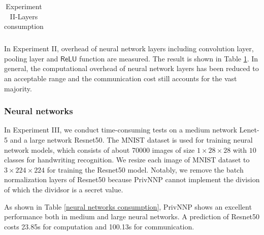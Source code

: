 \documentclass[letterpaper]{article} %
\begin{document}
\begin{table}[!ht]
{\begin{tabular}{|c|c|c|c|c|c|}
        \end{tabular}}

        \caption{Experiment II-Layers consumption}
        \label{Layers_consumption}
    \end{table}
    In Experiment II, overhead of neural network layers including
    convolution layer, pooling layer and $\mathsf{ReLU}$ function are measured.
    The result is shown in Table \ref{Layers_consumption}.
    In general, the computational overhead of neural network layers has been reduced to an acceptable range
    and the communication cost still accounts for the vast majority.


    \subsubsection{Neural networks}
    In Experiment III, we conduct
    time-consuming tests on a medium network Lenet-5 \cite{Lenet5} and a large network Resnet50\cite{DeepResidualLearning}.
    The MNIST dataset \cite{MNIST} is used for training neural network models, which consists of about 70000 images of size $1\times 28 \times 28$ with $10$ classes
    for handwriting recognition.
    We resize each image of MNIST dataset to $3\times 224 \times 224$ for training the Resnet50 model.
    Notably, we remove the batch normalization layers of Resnet50 because PrivNNP
    cannot implement the division of which the dividsor is a secret value.

    \begin{table}[!ht]
        \center
        \caption{Experiment III-Neural networks consumption}
        \label{neural networks consumption}
    \end{table}
    As shown in Table \ref{neural networks consumption}, PrivNNP shows an excellent performance
    both in medium and large neural networks.
    A prediction of Resnet50 costs 23.85s for computation and 100.13s for communication.
\end{document}
